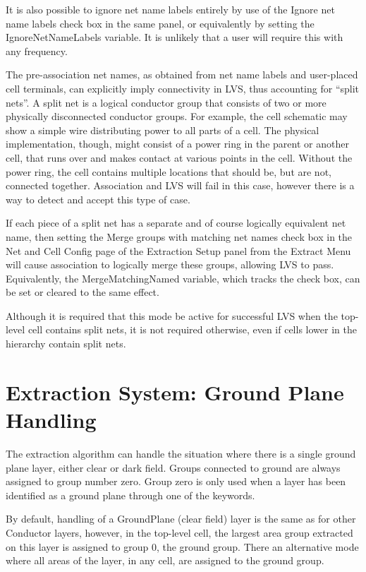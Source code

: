 It is also possible to ignore net name labels entirely by use of the
{\cb Ignore net name labels} check box in the same panel, or
equivalently by setting the {\et IgnoreNetNameLabels} variable.  It is
unlikely that a user will require this with any frequency.

The pre-association net names, as obtained from net name labels and
user-placed cell terminals, can explicitly imply connectivity in LVS,
thus accounting for ``split nets''.  A split net is a logical
conductor group that consists of two or more physically disconnected
conductor groups.  For example, the cell schematic may show a simple
wire distributing power to all parts of a cell.  The physical
implementation, though, might consist of a power ring in the parent or
another cell, that runs over and makes contact at various points in
the cell.  Without the power ring, the cell contains multiple
locations that should be, but are not, connected together. 
Association and LVS will fail in this case, however there is a way to
detect and accept this type of case.

If each piece of a split net has a separate and of course logically
equivalent net name, then setting the {\cb Merge groups with matching
net names} check box in the {\cb Net and Cell Config} page of the {\cb
Extraction Setup} panel from the {\cb Extract Menu} will cause
association to logically merge these groups, allowing LVS to pass. 
Equivalently, the {\et MergeMatchingNamed} variable, which tracks the
check box, can be set or cleared to the same effect.

Although it is required that this mode be active for successful LVS
when the top-level cell contains split nets, it is not required
otherwise, even if cells lower in the hierarchy contain split nets.


\section{Extraction System:  Ground Plane Handling}

The extraction algorithm can handle the situation where there is a
single ground plane layer, either clear or dark field.  Groups
connected to ground are always assigned to group number zero.  Group
zero is only used when a layer has been identified as a ground plane
through one of the keywords.

By default, handling of a {\et GroundPlane} (clear field) layer is the
same as for other {\et Conductor} layers, however, in the top-level
cell, the largest area group extracted on this layer is assigned to
group 0, the ground group.  There an alternative mode where all areas
of the layer, in any cell, are assigned to the ground group.

